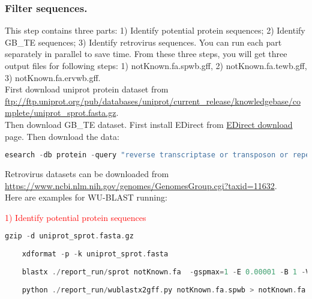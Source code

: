 \documentclass[a4paper,12pt]{article}
\begin{document}
	\pagebreak
	
	\subsubsection{Filter sequences.}
	This step contains three parts: 1) Identify potential protein sequences; 2) Identify GB\_TE sequences; 3) Identify retrovirus sequences. You can run each part separately in parallel to save time. From these three steps, you will get three output files for following steps: 1) notKnown.fa.spwb.gff, 2) notKnown.fa.tewb.gff, 3) notKnown.fa.ervwb.gff. \\
	
	\noindent First download uniprot protein dataset from \\ \url{ftp://ftp.uniprot.org/pub/databases/uniprot/current_release/knowledgebase/complete/uniprot_sprot.fasta.gz}. \\
	
\noindent Then download GB\_TE dataset. First install EDirect from \href{https://www.ncbi.nlm.nih.gov/books/NBK179288/#chapter6.Getting_Started} {\color{blue}EDirect download} page.
\noindent Then download the data: 

\begin{lstlisting}[language=scala]
esearch -db protein -query "reverse transcriptase or transposon or repetitive element or RNA-directed DNA polymerase or pol protein or non-LTR retrotransposon or mobile element or retroelement or polyprotein or retrovirus or (group-specific antigen gag) or polymerase (pol)" | efetch -format fasta > 260118_GB_TE.fa \end{lstlisting} 
	
\noindent Retrovirus datasets can be downloaded from  \\ \url{https://www.ncbi.nlm.nih.gov/genomes/GenomesGroup.cgi?taxid=11632}.\\
	
\noindent Here are examples for WU-BLAST running:
	
\noindent \textcolor{red}{1) Identify potential protein sequences}
\begin{lstlisting}[language=scala]
	gzip -d uniprot_sprot.fasta.gz
	
	xdformat -p -k uniprot_sprot.fasta
	
	blastx ./report_run/sprot notKnown.fa  -gspmax=1 -E 0.00001 -B 1 -V 1 -cpus=32 > notKnown.fa.spwb
	
	python ./report_run/wublastx2gff.py notKnown.fa.spwb > notKnown.fa.spwb.gff \end{lstlisting}
	
\end{document}
